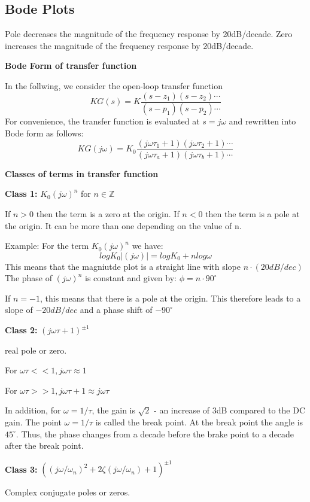 \newpage

\subsection{Bode Plots}
Pole decreases the magnitude of the frequency response by 20dB/decade.
Zero increases the magnitude of the frequency response by 20dB/decade.

\textbf{Bode Form of transfer function}

In the follwing, we consider the open-loop transfer function
$$KG(s) = K  \frac{(s-z_1)(s-z_2)\cdots}{(s-p_1)(s-p_2)\cdots}$$
For convenience, the transfer function is evaluated at $s = j\omega$ and rewritten into
Bode form as follows:
$$ KG(j\omega) = K_0 \frac{(j\omega \tau_1 +1)(j\omega \tau_2 +1)\cdots}{(j\omega \tau_a+1)(j\omega \tau_b +1)\cdots}$$

\textbf{Classes of terms in transfer function}

\textbf{Class 1:} $K_0(j\omega)^n$ for $n\in \mathbb{Z}$

If $n>0$ then the term is a zero at the origin. If $n<0$ then the term is a pole at the origin.
It can be more than one depending on the value of n.


Example: For the term $K_0(j\omega)^n$ we have:
$$ log K_0 |(j\omega)| = log K_0 + n log \omega$$
This means that the magniutde plot is a straight line with slope $n \cdot (20 dB/dec)$
The phase of $(j\omega)^n$ is constant and given by: $\phi = n \cdot 90^{\circ}$

If $n=-1$, this means that there is a pole at the origin. This therefore leads to a slope of $-20 dB/dec$ and a phase shift of $-90^{\circ}$

\textbf{Class 2:} $(j\omega \tau + 1)^{\pm1}$

real pole or zero.


For $\omega \tau << 1, j\omega \tau \approx 1$

For $\omega \tau >> 1, j\omega \tau + 1 \approx j\omega \tau$

In addition, for $\omega = 1/\tau$, the gain is $\sqrt{2}$ - an increase of 3dB compared to the DC gain.
The point $\omega = 1/\tau$ is called the break point. At the break point the angle is $45^{\circ}$.
Thus, the phase changes from a decade before the brake point to a decade after the break point.

\textbf{Class 3:} $((j\omega / \omega_n)^2 + 2\zeta (j\omega / \omega_n) + 1)^{\pm1}$

Complex conjugate poles or zeros.


